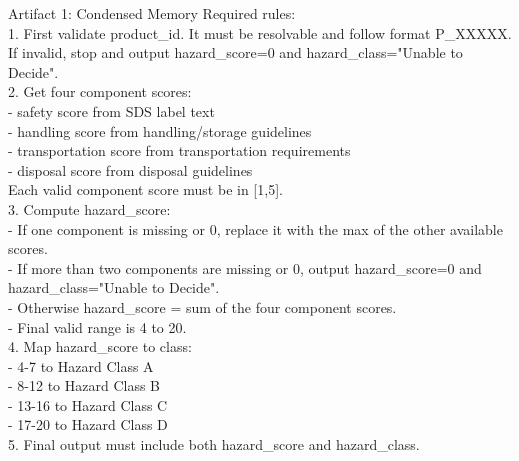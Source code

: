 \begin{CaseTraceBox}{Artifact 1: Condensed Memory}
\small\ttfamily
Required rules: \\
1. First validate product\_id. It must be resolvable and follow format P\_XXXXX. \\
\quad If invalid, stop and output hazard\_score=0 and hazard\_class="Unable to Decide". \\
2. Get four component scores: \\
\quad - safety score from SDS label text \\
\quad - handling score from handling/storage guidelines \\
\quad - transportation score from transportation requirements \\
\quad - disposal score from disposal guidelines \\
\quad Each valid component score must be in [1,5]. \\
3. Compute hazard\_score: \\
\quad - If one component is missing or 0, replace it with the max of the other available scores. \\
\quad - If more than two components are missing or 0, output hazard\_score=0 and hazard\_class="Unable to Decide". \\
\quad - Otherwise hazard\_score = sum of the four component scores. \\
\quad - Final valid range is 4 to 20. \\
4. Map hazard\_score to class: \\
\quad - 4-7 to Hazard Class A \\
\quad - 8-12 to Hazard Class B \\
\quad - 13-16 to Hazard Class C \\
\quad - 17-20 to Hazard Class D \\
5. Final output must include both hazard\_score and hazard\_class.
\end{CaseTraceBox}

